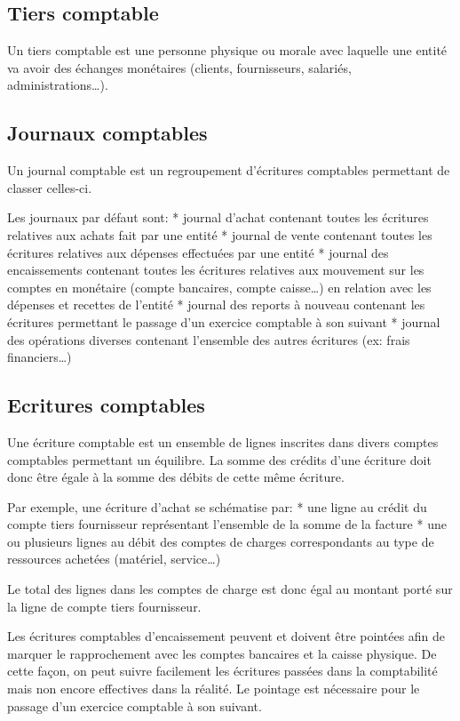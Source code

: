 \documentclass[a4paper,10pt,oneside,french]{sphinxmanual}
\begin{document}
\subsection{Tiers comptable}
\label{\detokenize{accounting/definition:tiers-comptable}}
Un tiers comptable est une personne physique ou morale avec
laquelle une entité va avoir des échanges monétaires (clients,
fournisseurs, salariés, administrations…).


\subsection{Journaux comptables}
\label{\detokenize{accounting/definition:journaux-comptables}}
Un journal comptable est un regroupement d’écritures comptables permettant de classer celles-ci.

Les journaux par défaut sont:
* journal d’achat contenant toutes les écritures relatives aux achats fait par une entité
* journal de vente contenant toutes les écritures relatives aux dépenses effectuées par une entité
* journal des encaissements contenant toutes les écritures relatives aux mouvement sur les comptes en monétaire (compte bancaires, compte caisse…) en relation avec les dépenses et recettes de l’entité
* journal des reports à nouveau contenant les écritures permettant le passage d’un exercice comptable à son suivant
* journal des opérations diverses contenant l’ensemble des autres écritures (ex: frais financiers…)


\subsection{Ecritures comptables}
\label{\detokenize{accounting/definition:ecritures-comptables}}
Une écriture comptable est un ensemble de lignes inscrites dans divers
comptes comptables permettant un équilibre.
La somme des crédits d’une écriture doit donc être égale à la somme des débits de cette même écriture.

Par exemple, une écriture d’achat se schématise par:
* une ligne au crédit du compte tiers fournisseur représentant l’ensemble de la somme de la facture
* une ou plusieurs lignes au débit des comptes de charges correspondants au type de ressources achetées (matériel, service…)

Le total des lignes dans les comptes de charge est donc égal au montant
porté sur la ligne de compte tiers fournisseur.

Les écritures comptables d’encaissement peuvent et doivent être pointées afin de marquer le rapprochement avec les comptes bancaires et
la caisse physique. De cette façon, on peut suivre facilement les écritures passées dans la comptabilité mais non encore effectives dans
la réalité. Le pointage est nécessaire pour le passage d’un exercice comptable à son suivant.
\end{document}
